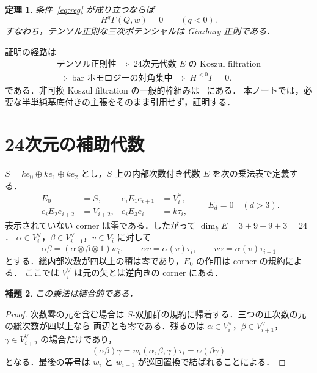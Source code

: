 \documentclass[a4paper,11pt]{ltjsarticle}
\newtheorem{theorem}{定理}[section]
\newtheorem{lemma}[theorem]{補題}
\theoremstyle{definition}
\newcommand{\dual}{^{\vee}}
\begin{document}
\begin{theorem}\label{thm:main}
条件~\eqref{eq:reg} が成り立つならば
\[
 H^q\Gamma(Q,w)=0\qquad(q<0).
\]
すなわち，テンソル正則な三次ポテンシャルは Ginzburg 正則である．
\end{theorem}

証明の経路は
\[
 \begin{gathered}
 \text{テンソル正則性}\ \Longrightarrow\
 \text{24次元代数 $E$ の Koszul filtration}\\
 \Longrightarrow\ \text{bar ホモロジーの対角集中}\ \Longrightarrow\ H^{<0}\Gamma=0.
 \end{gathered}
\]
である．非可換 Koszul filtration の一般的枠組みは~\cite{Piontkovski} にある．
本ノートでは，必要な半単純基底付きの主張をそのまま引用せず，証明する．

\section{24次元の補助代数}
$S=ke_0\oplus ke_1\oplus ke_2$ とし，$S$ 上の内部次数付き代数 $E$ を次の乗法表で定義する．
\begin{equation}\label{eq:Ecomponents}
 \begin{aligned}
 E_0&=S, &e_iE_1e_{i+1}&=V_i\dual,\\
 e_iE_2e_{i+2}&=V_{i+2},&e_iE_3e_i&=k\tau_i,
 \end{aligned}
 \qquad E_d=0\quad(d>3).
\end{equation}
表示されていない corner は零である．したがって $\dim_kE=3+9+9+3=24$．
$\alpha\in V_i\dual$，$\beta\in V_{i+1}\dual$，$v\in V_i$ に対して
\begin{equation}\label{eq:mult}
 \alpha\beta=(\alpha\otimes\beta\otimes1)w_i,\qquad
 \alpha v=\alpha(v)\tau_i,\qquad
 v\alpha=\alpha(v)\tau_{i+1}
\end{equation}
とする．総内部次数が四以上の積は零であり，$E_0$ の作用は corner の規約による．
ここでは $V_i\dual$ は元の矢とは逆向きの corner にある．

\begin{lemma}
この乗法は結合的である．
\end{lemma}
\begin{proof}
次数零の元を含む場合は $S$-双加群の規約に帰着する．三つの正次数の元の総次数が四以上なら
両辺とも零である．残るのは $\alpha\in V_i\dual$，$\beta\in V_{i+1}\dual$，
$\gamma\in V_{i+2}\dual$ の場合だけであり，
\[
 (\alpha\beta)\gamma
 =w_i(\alpha,\beta,\gamma)\tau_i
 =\alpha(\beta\gamma)
\]
となる．最後の等号は $w_i$ と $w_{i+1}$ が巡回置換で結ばれることによる．
\end{proof}
\end{document}
